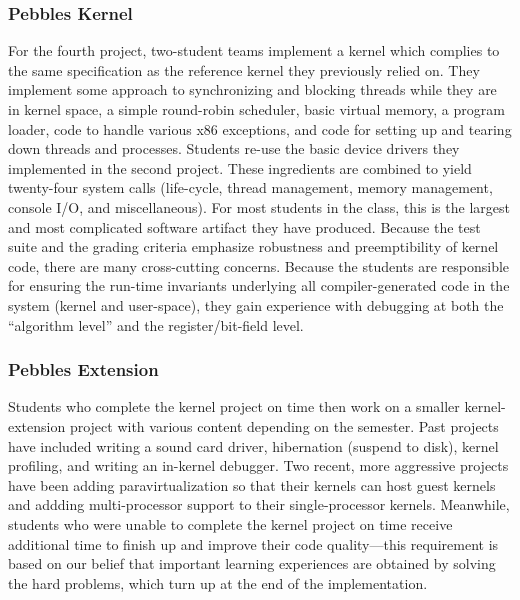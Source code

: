 \subsubsection{Pebbles Kernel}
For the fourth project, two-student teams
implement a kernel which complies to the
same specification as the reference kernel
they previously relied on.
They implement some approach to
synchronizing and blocking threads while
they are in kernel space,
a simple round-robin scheduler,
basic virtual memory,
a program loader,
code to handle various x86 exceptions,
and code for setting up and tearing down
threads and processes.
Students re-use the basic device drivers
they implemented in the second project.
These ingredients are combined to yield
twenty-four system calls
(life-cycle, thread management, memory management,
console I/O, and miscellaneous).
For most students in the class, this is the
largest and most complicated software artifact they
have produced.
Because the test suite and the grading criteria
emphasize robustness and preemptibility of
kernel code,
there are many cross-cutting concerns.
Because the students are responsible for ensuring
the run-time invariants underlying all compiler-generated
code in the system (kernel and user-space),
they gain experience with debugging at both the
``algorithm level'' and the register/bit-field level.

\subsubsection{Pebbles Extension}
Students who complete the kernel project on time
then work on a smaller kernel-extension project
with various content depending on the semester.
Past projects have included
writing a sound card driver,
hibernation (suspend to disk),
kernel profiling,
and writing an in-kernel debugger.
Two recent, more aggressive projects have been
adding paravirtualization so that their kernels
can host guest kernels and
addding multi-processor support to their single-processor kernels.
Meanwhile, students who were unable to complete
the kernel project on time receive additional time
to finish up and improve their code quality---this
requirement is based on our belief that important
learning experiences are obtained by solving the
hard problems,
which turn up at the end of the implementation.


